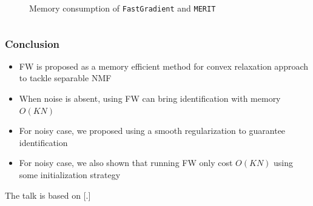 \documentclass[10pt,xcolor={usenames,dvipsnames,table}]{beamer}
\def\blue{\color{blue}}
\begin{document}
\begin{frame}
\begin{columns}
\begin{column}{0.55\textwidth}
\begin{figure}[t]
    \centering
    \vspace{-0.6cm}
    \captionsetup{justification=centering,margin=0.2cm,font=scriptsize}
    \caption*{Memory consumption of \texttt{FastGradient} and \texttt{MERIT}} 
\end{figure}
        \end{column}
    \end{columns}
\end{frame}

\begin{frame}
    \frametitle{Conclusion}
    \begin{itemize}
        \item FW is proposed as a memory efficient method for convex relaxation approach to tackle separable NMF
        \item When noise is absent, using FW can bring identification with memory $O(KN)$
        \item For noisy case, we proposed using a smooth regularization to guarantee identification
        \item For noisy case, we also shown that running FW only cost $O(KN)$ using some initialization strategy

    \end{itemize}

    The talk is based on {\scriptsize [.]}
\end{frame}
\end{document}
